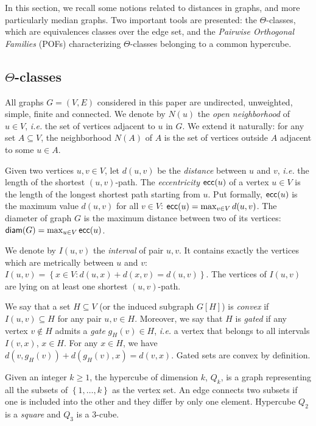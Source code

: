 \documentclass[a4paper,UKenglish,numberwithinsect,cleveref, autoref,anonymous]{lipics-v2021}
\newcommand{\set}[1]{\left\{ #1 \right\}}
\newcommand{\diam}{\mbox{\textsf{diam}}}
\newcommand{\ecc}{\mbox{\textsf{ecc}}}
\begin{document}
In this section, we recall some notions related to distances in graphs, and more particularly median graphs. Two important tools are presented: the $\Theta$-classes, which are equivalences classes over the edge set, and the \textit{Pairwise Orthogonal Families} (POFs) characterizing $\Theta$-classes belonging to a common hypercube. 

\subsection{$\Theta$-classes} 

All graphs $G = (V,E)$ considered in this paper are undirected, unweighted, simple, finite and connected. We denote by $N(u)$ the \textit{open neighborhood} of $u \in V$, {\em i.e.} the set of vertices adjacent to $u$ in $G$. We extend it naturally: for any set $A \subseteq V$, the neighborhood $N(A)$ of $A$ is the set of vertices outside $A$ adjacent to some $u \in A$.

Given two vertices $u,v \in V$, let $d(u,v)$ be the \textit{distance} between $u$ and $v$, {\em i.e.} the length of the shortest $(u,v)$-path. The \textit{eccentricity} $\ecc(u)$ of a vertex $u \in V$ is the length of the longest shortest path starting from $u$. Put formally, $\ecc(u)$ is the maximum value $d(u,v)$ for all $v \in V$: $\ecc(u) = \max_{v \in V} d(u,v)$. The diameter of graph $G$ is the maximum distance between two of its vertices: $\diam(G) = \max_{u \in V} \ecc(u)$. 

We denote by $I(u,v)$ the \textit{interval} of pair $u,v$. It contains exactly the vertices which are metrically between $u$ and $v$:
$I(u,v) = \set{x \in V: d(u,x) + d(x,v) = d(u,v)}$. The vertices of $I(u,v)$ are lying on at least one shortest $(u,v)$-path.

We say that a set $H\subseteq V$ (or the induced subgraph $G\left[H\right]$) is \textit{convex} if $I(u,v) \subseteq H$ for any pair $u,v \in H$. Moreover, we say that $H$ is \textit{gated} if any vertex $v \notin H$ admits a \textit{gate} $g_H(v) \in H$, {\em i.e.} a vertex that belongs to all intervals $I(v,x)$, $x\in H$. For any $x \in H$, we have $d(v,g_H(v)) + d(g_H(v),x) = d(v,x)$. Gated sets are convex by definition.

Given an integer $k \ge 1$, the hypercube of dimension $k$, $Q_k$, is a graph representing all the subsets of $\set{1,\ldots,k}$ as the vertex set. An edge connects two subsets if one is included into the other and they differ by only one element. Hypercube $Q_2$ is a \textit{square} and $Q_3$ is a $3$-cube.
\end{document}
